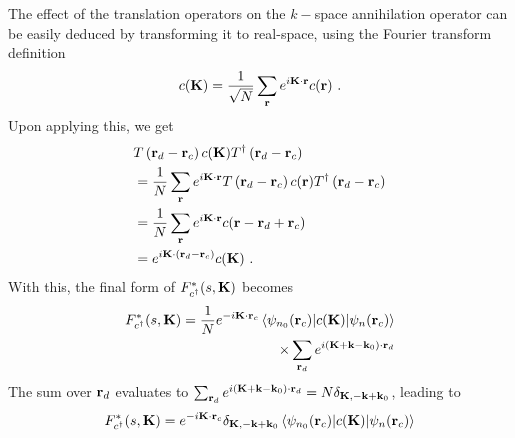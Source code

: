 \documentclass[reprint,hidelinks]{revtex4-2}
\begin{document}
The effect of the translation operators on the \(k-\)space annihilation operator can be easily deduced by transforming it to real-space, using the Fourier transform definition
\begin{equation}\begin{aligned}\label{fourTransf}
	c({\bf K}) = \frac{1}{\sqrt N}\sum_{\bf r}e^{i{\bf K}\cdot{\bf r}}c({\bf r})~.
\end{aligned}\end{equation}
Upon applying this, we get
\begin{equation}\begin{aligned}\label{translationOnField}
	&T\left({\bf r}_d - {\bf r}_c\right) c({\bf K}) T^\dagger\left({\bf r}_d - {\bf r}_c\right)\\
	&= \frac{1}{N}\sum_{\bf r}e^{i{\bf K}\cdot{\bf r}}T\left({\bf r}_d - {\bf r}_c\right) c({\bf r}) T^\dagger\left({\bf r}_d - {\bf r}_c\right)\\
	&= \frac{1}{N}\sum_{\bf r}e^{i{\bf K}\cdot{\bf r}}c({\bf r} - {\bf r}_d + {\bf r}_c)\\
	&= e^{i{\bf K}\cdot\left({\bf r}_d - {\bf r}_c\right)}c({\bf K})~.
\end{aligned}\end{equation}
With this, the final form of \(F_{c^\dagger}^*(s, {\bf K})\) becomes
\begin{equation}\begin{aligned}
	F_{c^\dagger}^*(s, {\bf K}) = \frac{1}{N}e^{-i {\bf K}\cdot{\bf r}_c}\braket{\psi_{n_0}({\bf r}_c)|c({\bf K})|\psi_{n}({\bf r}_c)}\\
	\times\sum_{{\bf r}_d}e^{i \left({\bf K} + {\bf k} - {\bf k}_0\right)\cdot{\bf r}_d}
\end{aligned}\end{equation}
The sum over \({\bf r}_d\) evaluates to \(\sum_{{\bf r}_d}e^{i \left({\bf K} + {\bf k} - {\bf k}_0\right)\cdot{\bf r}_d} = N \delta_{{\bf K}, - {\bf k} + {\bf k}_0}\), leading to
\begin{equation}\begin{aligned}
	F_{c^\dagger}^*(s, {\bf K}) = e^{-i {\bf K}\cdot{\bf r}_c}\delta_{{\bf K}, - {\bf k} + {\bf k}_0}\braket{\psi_{n_0}({\bf r}_c)|c({\bf K})|\psi_{n}({\bf r}_c)}
\end{aligned}\end{equation}
\end{document}
